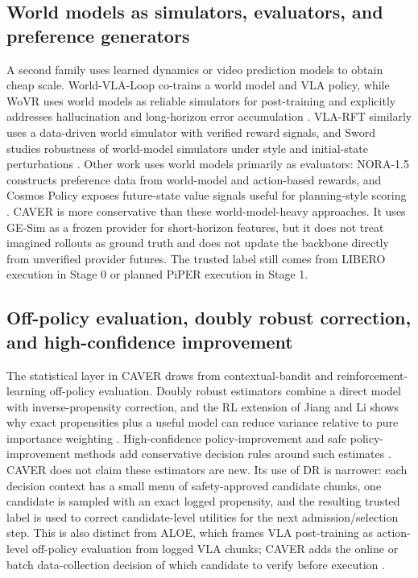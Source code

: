 \documentclass[10pt]{article}
\theoremstyle{plain}
\theoremstyle{definition}
\theoremstyle{remark}
\begin{document}
\subsection{World models as simulators, evaluators, and preference generators}
A second family uses learned dynamics or video prediction models to obtain cheap scale. World-VLA-Loop co-trains a world model and VLA policy, while WoVR uses world models as reliable simulators for post-training and explicitly addresses hallucination and long-horizon error accumulation \citep{liu2026worldvlaloop,jiang2026wovr}. VLA-RFT similarly uses a data-driven world simulator with verified reward signals, and Sword studies robustness of world-model simulators under style and initial-state perturbations \citep{li2025vlarft,gao2026sword}. Other work uses world models primarily as evaluators: NORA-1.5 constructs preference data from world-model and action-based rewards, and Cosmos Policy exposes future-state value signals useful for planning-style scoring \citep{hung2025nora15,kim2026cosmospolicy}. CAVER is more conservative than these world-model-heavy approaches. It uses GE-Sim as a frozen provider for short-horizon features, but it does not treat imagined rollouts as ground truth and does not update the backbone directly from unverified provider futures. The trusted label still comes from LIBERO execution in Stage 0 or planned PiPER execution in Stage 1.

\subsection{Off-policy evaluation, doubly robust correction, and high-confidence improvement}
The statistical layer in CAVER draws from contextual-bandit and reinforcement-learning off-policy evaluation. Doubly robust estimators combine a direct model with inverse-propensity correction, and the RL extension of Jiang and Li shows why exact propensities plus a useful model can reduce variance relative to pure importance weighting \citep{dudik2011dr,jiang2016doubly}. High-confidence policy-improvement and safe policy-improvement methods add conservative decision rules around such estimates \citep{thomas2015hcpi,laroche2019spibb}. CAVER does not claim these estimators are new. Its use of DR is narrower: each decision context has a small menu of safety-approved candidate chunks, one candidate is sampled with an exact logged propensity, and the resulting trusted label is used to correct candidate-level utilities for the next admission/selection step. This is also distinct from ALOE, which frames VLA post-training as action-level off-policy evaluation from logged VLA chunks; CAVER adds the online or batch data-collection decision of which candidate to verify before execution \citep{yang2026aloe}.
\end{document}
